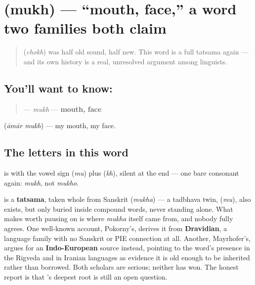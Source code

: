 \section[mukh]{ (mukh) — \textquotedblleft{}mouth, face,\textquotedblright{} a word two families both claim}

\label{lesson:BN-C12-mukh}



\begin{quote}
 (\emph{chokh}) was half old sound, half new. This word is a full tatsama again — and its own history is a real, unresolved argument among linguists.
\end{quote}

\subsection*{You'll want to know: }
\begin{quote}
\textbf{} — \emph{mukh} — \textbf{mouth, face}
\end{quote}

\textbf{ } (\emph{āmār mukh}) — my mouth, my face.

\subsection*{The letters in this word}
\textbf{} is \textbf{} with the vowel sign \textbf{} (\emph{mu}) plus \textbf{} (\emph{kh}), silent at the end — one bare consonant again: \emph{mukh}, not \emph{mukho}.

\begin{cousinweb}
\textbf{} is a \textbf{tatsama}, taken whole from Sanskrit \textbf{} (\emph{mukha}) — a tadbhava twin, \textbf{} (\emph{mu}), also exists, but only buried inside compound words, never standing alone. What makes  worth pausing on is where \emph{mukha} itself came from, and nobody fully agrees. One well-known account, Pokorny's, derives it from \textbf{Dravidian}, a language family with no Sanskrit or PIE connection at all. Another, Mayrhofer's, argues for an \textbf{Indo-European} source instead, pointing to the word's presence in the Rigveda and in Iranian languages as evidence it is old enough to be inherited rather than borrowed. Both scholars are serious; neither has won. The honest report is that 's deepest root is still an open question.
\end{cousinweb}

